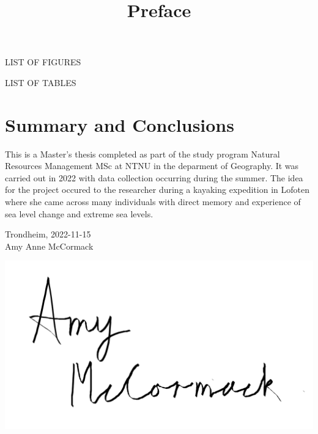 \documentclass{article}
\begin{document}
LIST OF FIGURES

LIST OF TABLES


\section*{Summary and Conclusions}

\title{Preface}
This is a Master's thesis completed as part of the study program Natural Resources Management MSc at NTNU in the deparment of Geography. It was carried out in 2022 with data collection occurring during the summer. The idea for the project occured to the researcher during a kayaking expedition in Lofoten where she came across many individuals with direct memory and experience of sea level change and extreme sea levels. \\[2cm]

\begin{center}
Trondheim, 2022-11-15\\[1pc]


Amy Anne McCormack 
\end{center}


\usepackage{graphicx}
\graphicspath{ {./images/} }
\includegraphics[scale=0.5]{fig/to use signature png}
\end{document}
